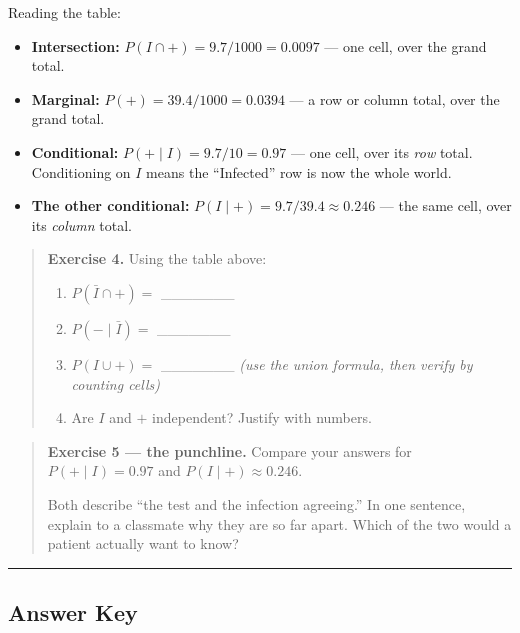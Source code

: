 \documentclass[
]{article}
\providecommand{\tightlist}{%
  \setlength{\itemsep}{0pt}\setlength{\parskip}{0pt}}
\begin{document}
Reading the table:

\begin{itemize}
\tightlist
\item
  \textbf{Intersection:} \(P(I \cap +) = 9.7/1000 = 0.0097\) --- one
  cell, over the grand total.
\item
  \textbf{Marginal:} \(P(+) = 39.4/1000 = 0.0394\) --- a row or column
  total, over the grand total.
\item
  \textbf{Conditional:} \(P(+ \mid I) = 9.7/10 = 0.97\) --- one cell,
  over its \emph{row} total. Conditioning on \(I\) means the
  ``Infected'' row is now the whole world.
\item
  \textbf{The other conditional:}
  \(P(I \mid +) = 9.7/39.4 \approx 0.246\) --- the same cell, over its
  \emph{column} total.
\end{itemize}

\begin{quote}
\textbf{Exercise 4.} Using the table above:

\begin{enumerate}
\def\labelenumi{(\alph{enumi})}
\tightlist
\item
  \(P(\bar{I} \cap +)=\) \_\_\_\_\_\_\_
\item
  \(P(- \mid \bar{I})=\) \_\_\_\_\_\_\_
\item
  \(P(I \cup +)=\) \_\_\_\_\_\_\_ \emph{(use the union formula, then
  verify by counting cells)}
\item
  Are \(I\) and \(+\) independent? Justify with numbers.
\end{enumerate}
\end{quote}

\begin{quote}
\textbf{Exercise 5 --- the punchline.} Compare your answers for
\(P(+ \mid I) = 0.97\) and \(P(I \mid +) \approx 0.246\).

Both describe ``the test and the infection agreeing.'' In one sentence,
explain to a classmate why they are so far apart. Which of the two would
a patient actually want to know?
\end{quote}

\begin{center}\rule{0.5\linewidth}{0.5pt}\end{center}

\subsection{Answer Key}\label{answer-key}
\end{document}
